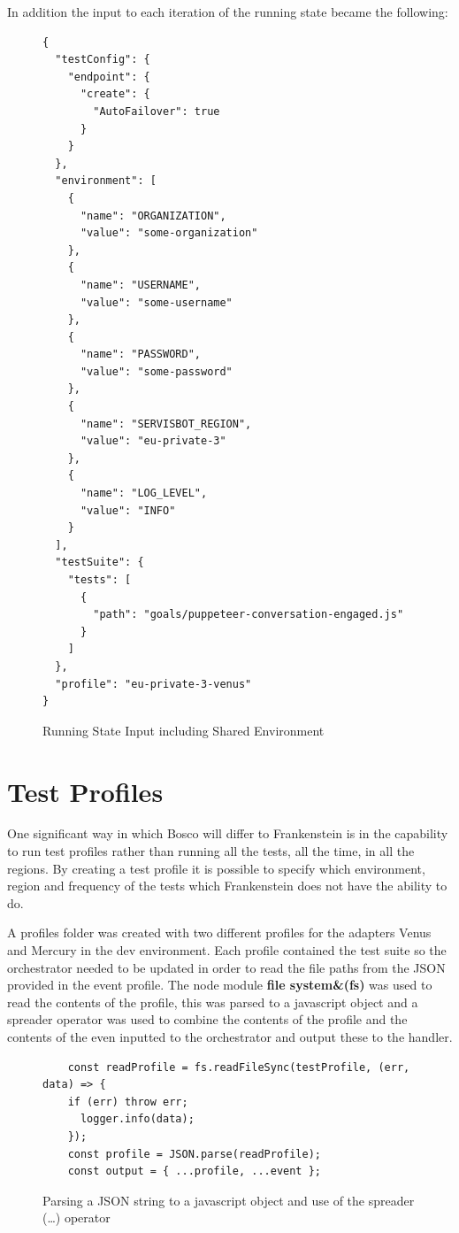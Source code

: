 \documentclass[12pt,a4paper,titlepage]{report}
\begin{document}
In addition the input to each iteration of the running state became the following:

\begin{figure}[H]
  \begin{tcolorbox}
    \begin{verbatim}
{
  "testConfig": {
    "endpoint": {
      "create": {
        "AutoFailover": true
      }
    }
  },
  "environment": [
    {
      "name": "ORGANIZATION",
      "value": "some-organization"
    },
    {
      "name": "USERNAME",
      "value": "some-username"
    },
    {
      "name": "PASSWORD",
      "value": "some-password"
    },
    {
      "name": "SERVISBOT_REGION",
      "value": "eu-private-3"
    },
    {
      "name": "LOG_LEVEL",
      "value": "INFO"
    }
  ],
  "testSuite": {
    "tests": [
      {
        "path": "goals/puppeteer-conversation-engaged.js"
      }
    ]
  },
  "profile": "eu-private-3-venus"
}

\end{verbatim}
  \end{tcolorbox}
  \caption{Running State Input including Shared Environment}
\end{figure}

\section{Test Profiles}
One significant way in which Bosco will differ to Frankenstein is in the capability to run test profiles rather than 
running all the tests, all the time, in all the regions. By creating a test profile it is possible to specify which 
environment, region and frequency of the tests which Frankenstein does not have the ability to do. 

A profiles folder was created with two different profiles for the adapters Venus and Mercury in the dev environment. Each profile 
contained the test suite so the orchestrator needed to be updated in order to read the file paths from the JSON provided in the 
event profile. The node module \textbf{file system\&(fs)} was used to read the contents of the profile, this was parsed to 
a javascript object and a spreader operator was used to combine the contents of the profile and the contents of 
the even inputted to the orchestrator and output these to the handler.

\begin{figure}[H]
  \begin{tcolorbox}
    \begin{verbatim}
    const readProfile = fs.readFileSync(testProfile, (err, data) => {
    if (err) throw err;
      logger.info(data);
    });
    const profile = JSON.parse(readProfile);
    const output = { ...profile, ...event };

    \end{verbatim}
  \end{tcolorbox}
  \caption{Parsing a JSON string to a javascript object and use of the spreader (\dots) operator}
\end{figure}
\end{document}
